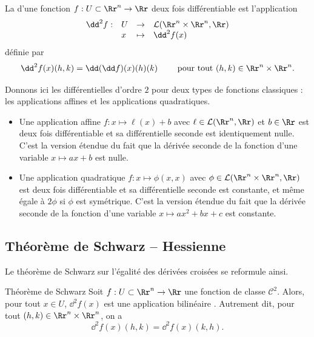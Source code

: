 \begin{definition}
La  d'une fonction $f: U \subset \Rr^n \to \Rr$ deux fois différentiable est l'application
$$\begin{array}{clll}
\dd^2 f : & U & \rightarrow & \mathcal{L}(\Rr^n \times \Rr^n,\Rr) \\
          & x & \mapsto & \dd^2 f(x)
\end{array}$$
définie par
$$\dd^2f(x)(h,k) = \dd(\dd f)(x)(h)(k) \qquad \text{ pour tout } (h,k)\in \Rr^n \times \Rr^n.$$
\end{definition}

Donnons ici les différentielles d'ordre $2$ pour deux types de fonctions classiques : les applications affines et les applications quadratiques. 
\begin{itemize}
    \item Une application affine $f : x \mapsto \ell(x)+b$ avec $\ell \in \mathcal{L}(\Rr^n,\Rr)$ et $b \in \Rr$
    est deux fois différentiable et sa différentielle seconde est identiquement nulle.
    C'est la version étendue du fait que la dérivée seconde de la fonction d'une variable $x \mapsto ax+b$ est nulle.
    
    \item Une application quadratique $f: x \mapsto \phi(x,x)$ avec $\phi \in \mathcal{L}(\Rr^n \times \Rr^n, \Rr)$
    est deux fois différentiable et sa différentielle seconde est constante, et même égale à $2\phi$ si $\phi$ est symétrique.
    C'est la version étendue du fait que la dérivée seconde de la fonction d'une variable $x \mapsto ax^2+bx+c$ est constante.
\end{itemize}

\subsection{Théorème de Schwarz -- Hessienne}

Le théorème de Schwarz sur l'égalité des dérivées croisées se reformule ainsi.
\begin{theoreme}{Théorème de Schwarz}{}
Soit $f:U\subset \Rr^n\to \Rr$ une fonction de classe $\mathcal{C}^2$. 
Alors, pour tout $x \in U$, $\dd^2f(x)$ est une application bilinéaire . 
Autrement dit, pour tout $(h,k)\in \Rr^n \times \Rr^n$, on a
$$\dd^2f(x)(h,k) = \dd^2f(x)(k,h).$$
\end{theoreme}


\bigskip

